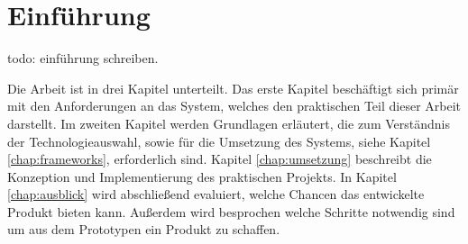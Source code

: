 
\chapter{Einführung}
\label{chap:introduction}

todo: einführung schreiben.

Die Arbeit ist in drei Kapitel unterteilt. Das erste Kapitel beschäftigt sich primär mit den
Anforderungen an das System, welches den praktischen Teil dieser Arbeit darstellt.
Im zweiten Kapitel werden Grundlagen erläutert, die zum Verständnis der Technologieauswahl,
sowie für die Umsetzung des Systems, siehe Kapitel \ref{chap:frameworks}, erforderlich sind.
Kapitel \ref{chap:umsetzung} beschreibt die Konzeption und Implementierung des praktischen Projekts.
In Kapitel \ref{chap:ausblick} wird abschließend evaluiert, welche Chancen das entwickelte Produkt bieten kann.
Außerdem wird besprochen welche Schritte notwendig sind um aus dem Prototypen ein Produkt zu schaffen.
